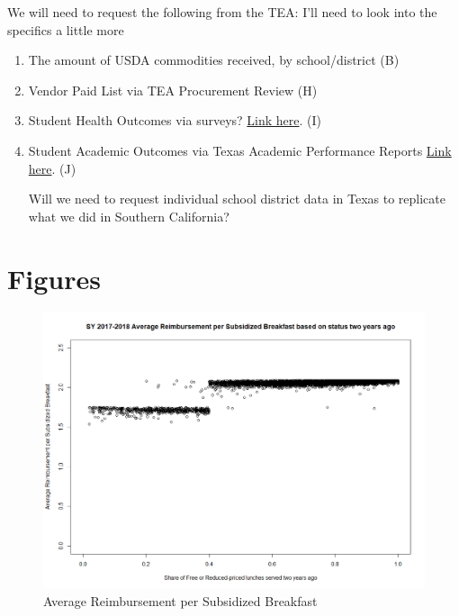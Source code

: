 \documentclass[12pt]{article}
\begin{document}
We will need to request the following from the TEA:
I'll need to look into the specifics a little more
\begin{enumerate} 
	\item The amount of USDA commodities received, by school/district (B)
	\item Vendor Paid List via TEA Procurement Review (H)
	\item Student Health Outcomes via surveys? \href{https://healthdata.dshs.texas.gov/dashboard/surveys-and-profiles/school-health-profiles}{Link here}. (I)
	\item Student Academic Outcomes via Texas Academic Performance Reports \href{https://tea.texas.gov/texas-schools/accountability/academic-accountability/performance-reporting/texas-academic-performance-reports}{Link here}. (J)

Will we need to request individual school district data in Texas to replicate what we did in Southern California?
	
\end{enumerate}



\section{Figures}

\begin{figure}[h]
	\centering
	\includegraphics[width = \linewidth, keepaspectratio]{"4_9_2024_reimbursement_per_sub_plot.png"}
	\caption{Average Reimbursement per Subsidized Breakfast}
	\label{fig:your_label}
\end{figure}
\end{document}
